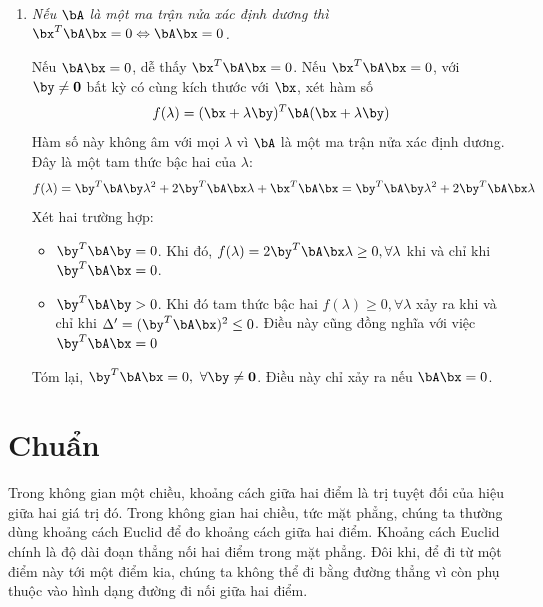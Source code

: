 \begin{enumerate}
    \item \textit{Nếu $\bA$ là một ma trận nửa xác định dương thì
    $\bx^T\bA\bx = 0 \Leftrightarrow \bA\bx = 0$.}

    Nếu $\bA\bx = 0$, dễ thấy $\bx^T\bA\bx = 0$. Nếu $\bx^T\bA\bx = 0$, với $\by \neq \mathbf{0}$ bất kỳ có cùng kích thước với $\bx$, xét hàm số 
    \begin{equation}
        f(\lambda) = (\bx + \lambda \by)^T\bA(\bx + \lambda\by)
    \end{equation}
    Hàm số này không âm với mọi $\lambda$ vì $\bA$ là một ma trận nửa xác định
    dương. Đây là một tam thức bậc hai của $\lambda$:
    \begin{equation}
        f(\lambda) = \by^T\bA\by \lambda^2 + 2\by^T\bA\bx \lambda + \bx^T\bA\bx
        = \by^T\bA\by \lambda^2 + 2\by^T\bA\bx \lambda
    \end{equation}
    Xét hai trường hợp:
    \begin{itemize}

        \item $\by^T\bA\by = 0$. Khi đó, $f(\lambda) = 2\by^T\bA\bx \lambda
        \geq 0, \forall \lambda$ khi và chỉ khi $\by^T\bA\bx = 0$.

        \item $\by^T\bA\by > 0$. Khi đó tam thức bậc hai $f(\lambda) \geq 0,
        \forall \lambda$ xảy ra khi và chỉ khi $\Delta' = (\by^T\bA\bx)^2 \leq
        0$. Điều này cũng đồng nghĩa với việc $\by^T\bA\bx = 0$
    \end{itemize}
    Tóm lại, $\by^T\bA\bx = 0, ~\forall \by \neq \mathbf{0}$. Điều này chỉ xảy
    ra nếu $\bA\bx = 0$.  \dpcm %

\end{enumerate}








\section{Chuẩn}
\label{sec:2_norm}
Trong không gian một chiều, khoảng cách giữa hai điểm là trị tuyệt đối của hiệu
giữa hai giá trị đó. Trong không gian hai chiều, tức mặt phẳng, chúng ta thường
dùng khoảng cách Euclid để đo khoảng cách giữa hai điểm. Khoảng cách Euclid
chính là độ dài đoạn thẳng nối hai điểm trong mặt phẳng. Đôi khi, để đi từ một
điểm này tới một điểm kia, chúng ta không thể đi bằng đường thẳng vì còn phụ
thuộc vào hình dạng đường đi nối giữa hai điểm.

